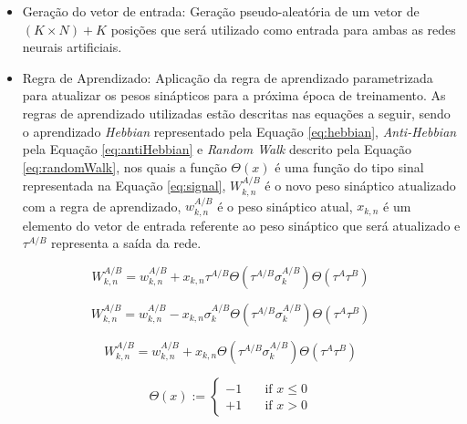 \documentclass[a4paper,10pt,oneside,conference,final,keeplastbox]{inatel}
\begin{document}
        \begin{itemize}
            
            \item Geração do vetor de entrada:
            Geração pseudo-aleatória de um vetor de $(K \times N) + K$ posições que será utilizado como entrada para ambas as redes neurais artificiais.
                
            \item Regra de Aprendizado:
            Aplicação da regra de aprendizado parametrizada para atualizar os pesos sinápticos para a próxima época de treinamento. As regras de aprendizado utilizadas estão descritas nas equações a seguir, sendo o aprendizado \textit{Hebbian} representado pela Equação \eqref{eq:hebbian}, \textit{Anti-Hebbian} pela Equação \eqref{eq:antiHebbian} e \textit{Random Walk} descrito pela Equação \eqref{eq:randomWalk}, nos quais a função \textit{$\Theta(x)$} é uma função do tipo sinal representada na Equação \ref{eq:signal}, $W^{A/B}_{k,n}$ é o novo peso sináptico atualizado com a regra de aprendizado, $w^{A/B}_{k,n}$ é o peso sináptico atual, $x_{k,n}$ é um elemento do vetor de entrada referente ao peso sináptico que será atualizado e $\tau^{A/B}$ representa a saída da rede.
            
        \end{itemize}
            
        \begin{equation}
            \label{eq:hebbian}
            W_{k,n}^{A/B} = w_{k,n}^{A/B} + x_{k,n} \tau^{A/B} \Theta(\tau^{A/B} \sigma_{k}^{A/B}) \Theta(\tau^{A} \tau^{B})
        \end{equation}
            
        \begin{equation}
            \label{eq:antiHebbian}
            W_{k,n}^{A/B} = w_{k,n}^{A/B} - x_{k,n} \sigma_{k}^{A/B} \Theta(\tau^{A/B} \sigma_{k}^{A/B}) \Theta(\tau^{A} \tau^{B})
        \end{equation}
            
        \begin{equation}
            \label{eq:randomWalk}
            W_{k,n}^{A/B} = w_{k,n}^{A/B} + x_{k,n} \Theta(\tau^{A/B} \sigma_{k}^{A/B}) \Theta(\tau^{A} \tau^{B})
        \end{equation}

        \begin{equation}
            \label{eq:signal}
            \Theta (x) :=
            \begin{cases}
                -1 & \quad \text{if } x \leq 0 \\
                +1 & \quad \text{if } x > 0
            \end{cases}
        \end{equation}
        
\end{document}

